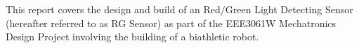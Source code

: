 \maketitle
\clearpage

\setcounter{tocdepth}{2}                                                      %










\begin{homeworkProblem}[{Introduction}]
This report covers the design and build of an Red\(\slash\)Green Light Detecting Sensor (hereafter referred to as RG Sensor) as part of the EEE3061W Mechatronics Design Project involving the building of a biathletic robot.
\end{homeworkProblem}

